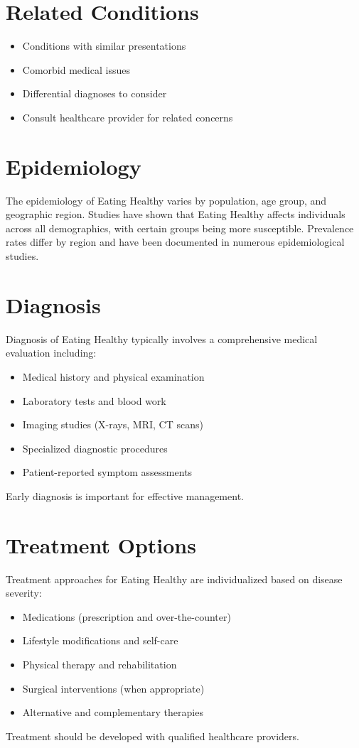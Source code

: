 \section*{Related Conditions}
\begin{itemize}
  \item Conditions with similar presentations
  \item Comorbid medical issues
  \item Differential diagnoses to consider
  \item Consult healthcare provider for related concerns
\end{itemize}

\section*{Epidemiology}
The epidemiology of Eating Healthy varies by population, age group, and geographic region. Studies have shown that Eating Healthy affects individuals across all demographics, with certain groups being more susceptible. Prevalence rates differ by region and have been documented in numerous epidemiological studies.

\section*{Diagnosis}
Diagnosis of Eating Healthy typically involves a comprehensive medical evaluation including:
\begin{itemize}
  \item Medical history and physical examination
  \item Laboratory tests and blood work
  \item Imaging studies (X-rays, MRI, CT scans)
  \item Specialized diagnostic procedures
  \item Patient-reported symptom assessments
\end{itemize}
Early diagnosis is important for effective management.

\section*{Treatment Options}
Treatment approaches for Eating Healthy are individualized based on disease severity:
\begin{itemize}
  \item Medications (prescription and over-the-counter)
  \item Lifestyle modifications and self-care
  \item Physical therapy and rehabilitation
  \item Surgical interventions (when appropriate)
  \item Alternative and complementary therapies
\end{itemize}
Treatment should be developed with qualified healthcare providers.

